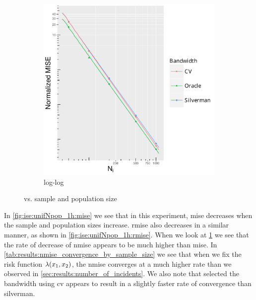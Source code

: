 \begin{figure}[htbp]
\begin{subfigure}[b]{0.24\textwidth}
        \caption{}
        \label{fig:ise:unifNpop_1h:nmise}
    \end{subfigure}
    \begin{subfigure}[b]{0.24\textwidth}
        \includegraphics[width=\textwidth]{results/by_pop_size/NMISE-vs-population-log-log}
        \caption{ log-log}
        \label{fig:ise:unifNpop_1h:nmise_log_log}
    \end{subfigure}
    \caption[: by sample and population size]{ vs. sample and population size}
    \label{fig:ise:unifNpop_1h}
\end{figure}

In \cref{fig:ise:unifNpop_1h:mise} we see that in this experiment,
\gls{mise} decreases when the sample and population sizes increase.
\Gls{rmise} also decreases in a similar manner, as shown in \cref{fig:ise:unifNpop_1h:rmise}.
When we look at \cref{fig:ise:unifNpop_1h:nmise} we see that the rate of decrease of \gls{nmise} appears to be much higher than \gls{mise}.
In \cref{tab:results:nmise_convergence_by_sample_size} we see that when we fix the risk function $\lambda (x_1, x_2)$,
the \gls{nmise} converges at a much higher rate than we observed in \cref{sec:results:number_of_incidents}.
We also note that selected the bandwidth using \gls{cv} appears to result in a slightly faster rate of convergence than \gls{silverman}.


